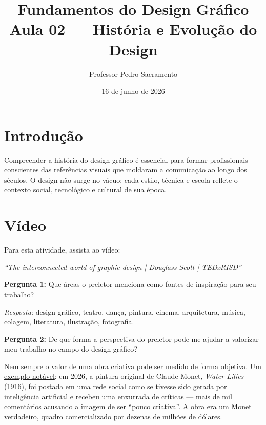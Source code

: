 \documentclass[a4paper,12pt]{article}
\title{\textbf{Fundamentos do Design Gráfico}\\[4pt]\large Aula 02 --- História e Evolução do Design}
\author{Professor Pedro Sacramento}
\date{16 de junho de 2026}
\begin{document}
\maketitle

\section{Introdução}

Compreender a história do design gráfico é essencial para formar profissionais conscientes das referências visuais que moldaram a comunicação ao longo dos séculos. O design não surge no vácuo: cada estilo, técnica e escola reflete o contexto social, tecnológico e cultural de sua época.


\section{Vídeo}

\noindent Para esta atividade, assista ao vídeo:

\begin{center}
\href{https://www.youtube.com/watch?v=UYhBYu_yauU}{\textit{``The interconnected world of graphic design | Douglass Scott | TEDxRISD''}}
\end{center}

\bigskip
\noindent\textbf{Pergunta 1:} Que áreas o preletor menciona como fontes de inspiração para seu trabalho?

\medskip
\noindent\textit{Resposta:} design gráfico, teatro, dança, pintura, cinema, arquitetura, música, colagem, literatura, ilustração, fotografia.

\medskip
\noindent\textbf{Pergunta 2:} De que forma a perspectiva do preletor pode me ajudar a valorizar meu trabalho no campo do design gráfico?

\medskip
\noindent Nem sempre o valor de uma obra criativa pode ser medido de forma objetiva. \href{https://www.terra.com.br/byte/mais-de-mil-comentarios-criticaram-uma-imagem-de-ia-so-que-era-um-monet-verdadeiro,83718b3ea5d626e0ccf59ee5233b3f8738uffiw1.html}{Um exemplo notável}: em 2026, a pintura original de Claude Monet, \textit{Water Lilies} (1916), foi postada em uma rede social como se tivesse sido gerada por inteligência artificial e recebeu uma enxurrada de críticas --- mais de mil comentários acusando a imagem de ser ``pouco criativa''. A obra era um Monet verdadeiro, quadro comercializado por dezenas de milhões de dólares.
\end{document}
